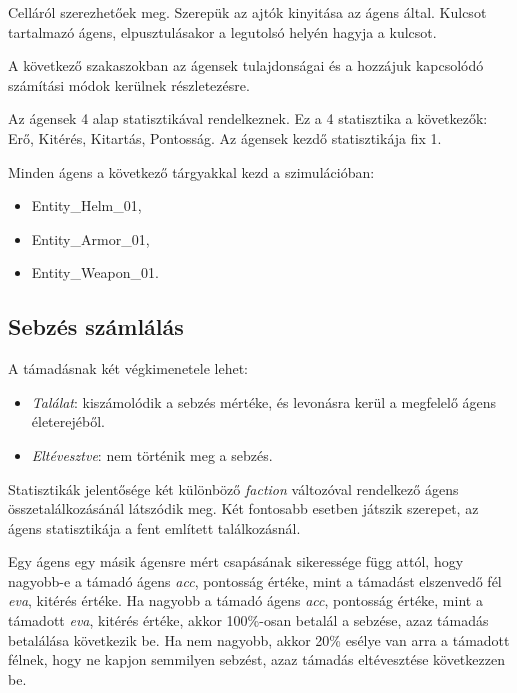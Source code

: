 
Celláról szerezhetőek meg.
Szerepük az ajtók kinyitása az ágens által.
Kulcsot tartalmazó ágens, elpusztulásakor a legutolsó helyén hagyja a kulcsot.


A következő szakaszokban az ágensek tulajdonságai és a hozzájuk kapcsolódó számítási módok kerülnek részletezésre.

\label{statisztika}

Az ágensek 4 alap statisztikával rendelkeznek.
Ez a 4 statisztika a következők: Erő, Kitérés, Kitartás, Pontosság. Az ágensek kezdő statisztikája fix 1.

Minden ágens a következő tárgyakkal kezd a szimulációban:
\begin{itemize}
    \item Entity\_Helm\_01,
    \item Entity\_Armor\_01,
    \item Entity\_Weapon\_01.
\end{itemize}

\subsection{Sebzés számlálás}

\label{számlálás}

A támadásnak két végkimenetele lehet:

\begin{itemize}
    \item \textit{Találat}: kiszámolódik a sebzés mértéke, és levonásra kerül a megfelelő ágens életerejéből.
    \item \textit{Eltévesztve}: nem történik meg a sebzés.
\end{itemize}


Statisztikák jelentősége két különböző \textit{faction} változóval rendelkező ágens összetalálkozásánál látszódik meg.
Két fontosabb esetben játszik szerepet, az ágens statisztikája a fent említett találkozásnál.

Egy ágens egy másik ágensre mért csapásának sikeressége függ attól, hogy nagyobb-e a támadó ágens \textit{acc}, pontosság értéke, mint a támadást elszenvedő fél \textit{eva}, kitérés értéke.
Ha nagyobb a támadó ágens \textit{acc}, pontosság értéke, mint a támadott \textit{eva}, kitérés értéke, akkor 100\%-osan betalál a sebzése, azaz támadás betalálása következik be.
Ha nem nagyobb, akkor 20\% esélye van arra a támadott félnek, hogy ne kapjon semmilyen sebzést, azaz támadás eltévesztése következzen be.

